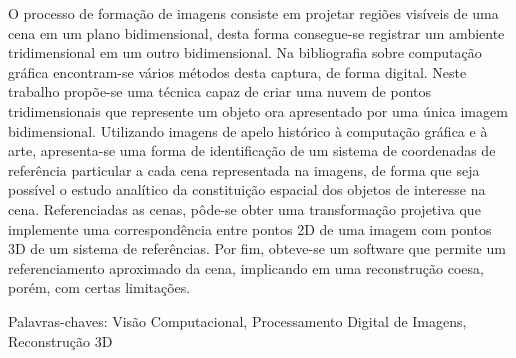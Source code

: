 	O processo de formação de imagens consiste em projetar regiões visíveis de uma cena em um plano bidimensional, desta forma consegue-se registrar um ambiente tridimensional em um outro bidimensional. Na bibliografia sobre computação gráfica encontram-se vários métodos desta captura, de forma digital. Neste trabalho propõe-se uma técnica capaz de criar uma nuvem de pontos tridimensionais que represente um objeto ora apresentado por uma única imagem bidimensional. Utilizando imagens de apelo histórico à computação gráfica e à arte, apresenta-se uma forma de identificação de um sistema de coordenadas de referência particular a cada cena representada na imagens, de forma que seja possível o estudo analítico da constituição espacial dos objetos de interesse na cena. Referenciadas as cenas, pôde-se obter uma transformação projetiva que implemente uma correspondência entre pontos 2D de uma imagem com pontos 3D de um sistema de referências. Por fim, obteve-se um software que permite um referenciamento aproximado da cena, implicando em uma reconstrução coesa, porém, com certas limitações.

\noindent Palavras-chaves: Visão Computacional, Processamento Digital de Imagens, Reconstrução 3D